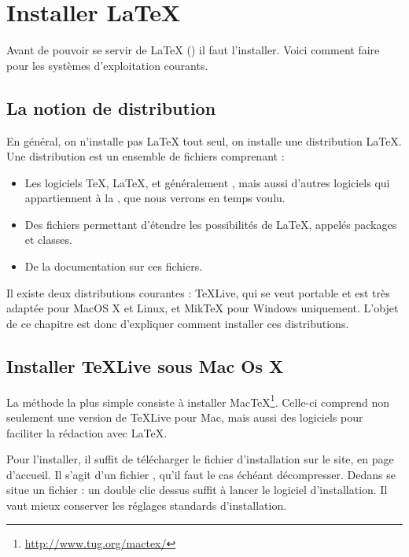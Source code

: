 \chapter {Installer \LaTeX{}}\label{install}

\begin{prealable}
    Avant de pouvoir se servir de \LaTeX{} (\XeLaTeX) il faut l'installer. Voici comment faire pour les systèmes d'exploitation courants.
\end{prealable}

\section{La notion de distribution}

En général, on n'installe pas \LaTeX{} tout seul, on installe une distribution \LaTeX{}. Une distribution est un ensemble de fichiers comprenant :
\begin{itemize}
\item Les logiciels \TeX, \LaTeX, et généralement \XeLaTeX, mais aussi d'autres logiciels qui appartiennent à la  , que nous verrons en temps voulu.
\item Des fichiers permettant d'étendre les possibilités de \LaTeX, appelés packages et classes.
\item De la documentation sur ces fichiers.
\end{itemize}

Il existe deux distributions courantes : TeXLive, qui se veut portable et est très adaptée  pour MacOS X et Linux, et MikTeX pour Windows uniquement. L'objet de ce chapitre est donc d'expliquer comment installer ces distributions.

\section{Installer TeXLive sous Mac Os X}

La méthode la plus simple consiste à installer MacTeX\footnote{\url{http://www.tug.org/mactex/}}. Celle-ci comprend non seulement une version de TeXLive pour Mac, mais aussi des logiciels pour faciliter la rédaction avec \LaTeX{}.

Pour l'installer, il suffit de télécharger le fichier d'installation sur le site, en page d'accueil. Il s'agit d'un fichier , qu'il faut le cas échéant décompresser. Dedans se situe un fichier  : un double clic dessus suffit à lancer le logiciel d'installation. Il vaut mieux conserver les réglages standards d'installation.

